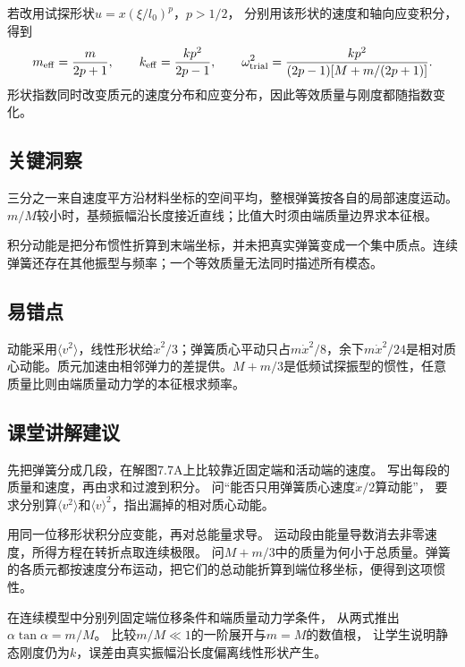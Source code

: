 \documentclass[UTF8,fontset=fandol,a4paper,11pt]{ctexart}
\begin{document}
若改用试探形状$u=x(\xi/l_0)^p$，$p>1/2$，
分别用该形状的速度和轴向应变积分，得到
\[
m_{\rm eff}=\frac m{2p+1},\qquad
k_{\rm eff}=\frac{kp^2}{2p-1},\qquad
\omega_{\rm trial}^2=
\frac{kp^2}{(2p-1)[M+m/(2p+1)]}.
\]
形状指数同时改变质元的速度分布和应变分布，因此等效质量与刚度都随指数变化。




\subsection*{关键洞察}

三分之一来自速度平方沿材料坐标的空间平均，整根弹簧按各自的局部速度运动。$m/M$较小时，基频振幅沿长度接近直线；比值大时须由端质量边界求本征根。

积分动能是把分布惯性折算到末端坐标，并未把真实弹簧变成一个集中质点。连续弹簧还存在其他振型与频率；一个等效质量无法同时描述所有模态。




\subsection*{易错点}

动能采用$\langle v^2\rangle$，线性形状给$\dot x^2/3$；弹簧质心平动只占$m\dot x^2/8$，余下$m\dot x^2/24$是相对质心动能。质元加速由相邻弹力的差提供。$M+m/3$是低频试探振型的惯性，任意质量比则由端质量动力学的本征根求频率。




\subsection*{课堂讲解建议}

先把弹簧分成几段，在解图7.7A上比较靠近固定端和活动端的速度。
写出每段的质量和速度，再由求和过渡到积分。
问“能否只用弹簧质心速度$\dot x/2$算动能”，
要求分别算$\langle v^2\rangle$和$\langle v\rangle^2$，指出漏掉的相对质心动能。

用同一位移形状积分应变能，再对总能量求导。
运动段由能量导数消去非零速度，所得方程在转折点取连续极限。
问$M+m/3$中的质量为何小于总质量。弹簧的各质元都按速度分布运动，把它们的总动能折算到端位移坐标，便得到这项惯性。

在连续模型中分别列固定端位移条件和端质量动力学条件，
从两式推出$\alpha\tan\alpha=m/M$。
比较$m/M\ll1$的一阶展开与$m=M$的数值根，
让学生说明静态刚度仍为$k$，误差由真实振幅沿长度偏离线性形状产生。
\end{document}
